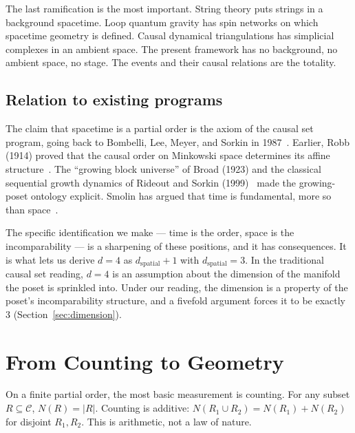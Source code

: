 \documentclass[11pt,letterpaper]{article}
\theoremstyle{remark}
\begin{document}
The last ramification is the most important. String theory puts
strings in a background spacetime. Loop quantum gravity has spin
networks on which spacetime geometry is defined. Causal dynamical
triangulations has simplicial complexes in an ambient space. The
present framework has no background, no ambient space, no stage. The
events and their causal relations are the totality.

\subsection{Relation to existing programs}

The claim that spacetime is a partial order is the axiom of the
causal set program, going back to Bombelli, Lee, Meyer, and Sorkin
in 1987~\cite{BLMS}. Earlier, Robb (1914) proved that the causal
order on Minkowski space determines its affine
structure~\cite{Robb1914}. The ``growing block universe'' of Broad
(1923) and the classical sequential growth dynamics of Rideout and
Sorkin (1999)~\cite{RideoutSorkin1999} made the growing-poset
ontology explicit. Smolin has argued that time is fundamental, more
so than space~\cite{Smolin2013}.

The specific identification we make — time is the order, space is
the incomparability — is a sharpening of these positions, and it
has consequences. It is what lets us derive $d = 4$ as
$d_{\mathrm{spatial}} + 1$ with $d_{\mathrm{spatial}} = 3$. In the
traditional causal set reading, $d = 4$ is an assumption about the
dimension of the manifold the poset is sprinkled into. Under our
reading, the dimension is a property of the poset's incomparability
structure, and a fivefold argument forces it to be exactly 3
(Section~\ref{sec:dimension}).

\section{From Counting to Geometry}
\label{sec:geometry}

On a finite partial order, the most basic measurement is counting.
For any subset $R \subseteq \mathcal{C}$, $N(R) = |R|$. Counting is
additive: $N(R_1 \cup R_2) = N(R_1) + N(R_2)$ for disjoint $R_1,
R_2$. This is arithmetic, not a law of nature.
\end{document}
